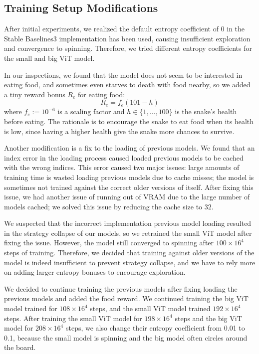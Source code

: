 \documentclass[conference]{IEEEtran}
\begin{document}
\subsection{Training Setup Modifications}\label{sec:training-mod}

After initial experiments,
we realized the default entropy coefficient of 0 in the Stable Baselines3
implementation has been used,
causing insufficient exploration and convergence to spinning. Therefore,
we tried different entropy coefficients for the small and big ViT model.

In our inspections,
we found that the model does not seem to be interested in eating food,
and sometimes even starves to death with food nearby,
so we added a tiny reward bonus $R_e$ for eating food:
$$
    R_e = f_e(101 - h)
$$
where $f_e:=10^{-6}$ is a scaling factor and $h\in\{1,\ldots,100\}$ is the
snake's health before eating.
The rationale is to encourage the snake to eat food when its health is low,
since having a higher health give the snake more chances to survive.

Another modification is a fix to the loading of previous models.
We found that an index error in the loading process caused loaded previous
models to be cached with the wrong indices. This error caused two major issues:
large amounts of training time is wasted loading previous models due to cache
misses;
the model is sometimes not trained against the correct older versions of itself.
After fixing this issue,
we had another issue of running out of VRAM due to the large number of models
cached; we solved this issue by reducing the cache size to $32$.

We suspected that the incorrect implementation previous model loading resulted
in the strategy collapse of our models,
so we retrained the small ViT model after fixing the issue. However,
the model still converged to spinning after $100\times 16^4$ steps of training.
Therefore,
we decided that training against older versions of the model is indeed
insufficient to prevent strategy collapse,
and we have to rely more on adding larger entropy bonuses to encourage
exploration.

We decided to continue training the previous models after fixing loading the
previous models and added the food reward.
We continued training the big ViT model trained for $108\times 16^4$ steps,
and the small ViT model trained $192\times 16^4$ steps.
After training the small ViT model for $198\times 16^4$ steps and the big ViT
model for $208\times 16^4$ steps,
we also change their entropy coefficient from 0.01 to 0.1,
because the small model is spinning and the big model often circles around the
board.
\end{document}
